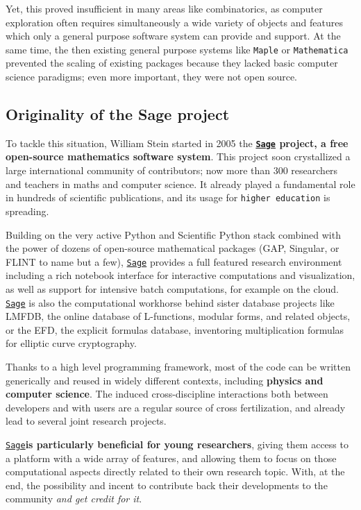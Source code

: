 \documentclass[a4,12pt]{amsart}
\newcommand{\sage}{\href{http://www.sagemath.org/}{\texttt{Sage}}\xspace}
\begin{document}
Yet, this proved insufficient in many areas like combinatorics, as
computer exploration often requires simultaneously a wide variety of
objects and features which only a general purpose software system can
provide and support. At the same time, the then existing general
purpose systems like \texttt{Maple} or \texttt{Mathematica} prevented
the scaling of existing packages because they lacked basic computer
science paradigms; even more important, they were not open source.

\subsection*{Originality of the Sage project}

To tackle this situation, William Stein started in 2005 the \textbf{\sage
project, a free open-source mathematics software system}. This project
soon crystallized a large international community of contributors; now
more than 300 researchers and teachers in maths and computer
science. It already played a fundamental role in hundreds of
scientific publications, and its usage for \texttt{higher education}
is spreading.

Building on the very active Python and Scientific Python stack
combined with the power of dozens of open-source mathematical packages
(GAP, Singular, or FLINT to name but a few), \sage provides a full
featured research environment including a rich notebook interface for
interactive computations and visualization, as well as support for
intensive batch computations, for example on the cloud. \sage is also
the computational workhorse behind sister database projects like
\textsc{LMFDB}, the online database of L-functions, modular forms, and
related objects, or the \textsc{EFD}, the explicit formulas database,
inventoring multiplication formulas for elliptic curve cryptography.

Thanks to a high level programming framework, most of the code can be
written generically and reused in widely different contexts, including
\textbf{physics and computer science}. The induced cross-discipline
interactions both between developers and with users
are a regular source of cross fertilization, and already lead to
several joint research projects.

\sage \textbf{is particularly beneficial for young researchers},
giving them access to a platform with a wide array of features, and
allowing them to focus on those computational aspects directly related
to their own research topic. With, at the end, the possibility and
incent to contribute back their developments to the community
\emph{and get credit for it}.
\end{document}
